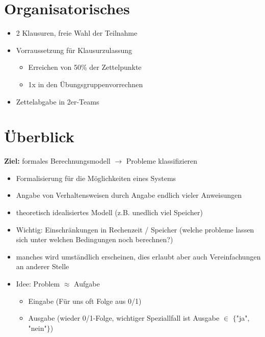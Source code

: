 
\section*{Organisatorisches}

\begin{itemize}
    \item 2 Klausuren, freie Wahl der Teilnahme
    \item Vorraussetzung für Klausurzulassung
    \begin{itemize}
        \item Erreichen von 50\% der Zettelpunkte
        \item 1x in den Übungsgruppenvorrechnen
    \end{itemize}
    \item Zettelabgabe in 2er-Teams
\end{itemize}

\section{Überblick}

\textbf{Ziel:} formales Berechnungsmodell $\rightarrow$ Probleme klassifizieren
\begin{itemize}
    \item Formalisierung für die Möglichkeiten eines Systems
    \item Angabe von Verhaltensweisen durch Angabe endlich vieler Anweisungen
    \item theoretisch idealisiertes Modell (z.B. unedlich viel Speicher)
    \item Wichtig: Einschränkungen in Rechenzeit / Speicher (welche probleme lassen sich unter welchen Bedingungen noch berechnen?)
    \item manches wird umständlich erscheinen, dies erlaubt aber auch Vereinfachungen an anderer Stelle
    \item Idee: Problem $\approx$ Aufgabe
    \begin{itemize}
        \item Eingabe (Für uns oft Folge aus 0/1)
        \item Ausgabe (wieder 0/1-Folge, wichtiger Speziallfall ist Ausgabe $\in$ $\{$"ja", "nein"$\}$)
    \end{itemize}
\end{itemize}

